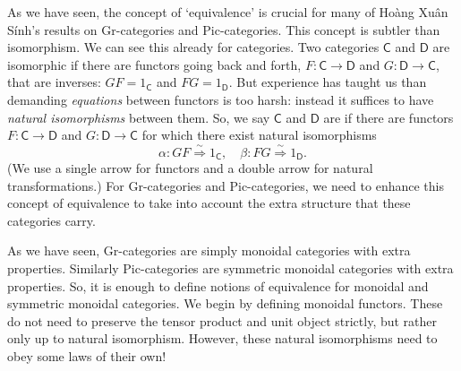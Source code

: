 \documentclass[reqno]{amsart}
\newcommand{\maps}{\colon}    %
\newcommand{\define}[1]{\textbf{\boldmath{#1}}}
\theoremstyle{definition}
\begin{document}
As we have seen, the concept of `equivalence' is crucial for many of 
Ho\`ang Xu\^an S\'inh's results on Gr-categories and Pic-categories.  This concept is subtler than isomorphism.  We can see this already for categories.  Two categories $\mathsf{C}$ and $\mathsf{D}$ are isomorphic if there are functors going back and forth, $F \maps \mathsf{C} \to \mathsf{D}$ and $G \maps \mathsf{D} \to \mathsf{C}$, that are inverses: $GF = 1_{\mathsf{C}}$ and $FG = 1_\mathsf{D}$.    But experience has taught us than demanding \emph{equations} between functors is too harsh: instead it suffices to have \emph{natural isomorphisms} between them.  So, we say $\mathsf{C}$ and $\mathsf{D}$ are \define{equivalent} if there are functors $F \maps \mathsf{C} \to \mathsf{D}$ and $G \maps \mathsf{D} \to \mathsf{C}$ for which there exist natural isomorphisms
\[   \alpha \maps GF \stackrel{\sim}{\Longrightarrow} 1_{\mathsf{C}}, \quad \beta \maps FG \stackrel{\sim}{\Longrightarrow} 1_\mathsf{D}. \]
(We use a single arrow for functors and a double arrow for natural transformations.)  For Gr-categories and Pic-categories, we need to enhance this concept of equivalence to take into account the extra structure that these categories carry.
 
As we have seen, Gr-categories are simply monoidal categories with extra properties.  Similarly Pic-categories are symmetric monoidal categories with extra properties.  So, it is enough to define notions of equivalence for monoidal and symmetric monoidal categories.  We begin by defining monoidal functors.  These do not need to preserve the tensor product and unit object strictly, but rather only up to natural isomorphism.  However, these natural isomorphisms need to obey some laws of their own!
\end{document}
